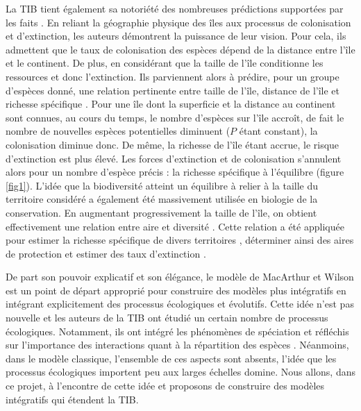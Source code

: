 La TIB tient également sa notoriété des nombreuses prédictions
supportées par les faits \cite{MacArthur1967}. En reliant la géographie
physique des îles aux processus de colonisation et d'extinction, les
auteurs démontrent la puissance de leur vision. Pour cela, ils admettent
que le taux de colonisation des espèces dépend de la distance entre
l'île et le continent. De plus, en considérant que la taille de l'île
conditionne les ressources et donc l'extinction. Ils parviennent alors à
prédire, pour un groupe d'espèces donné, une relation pertinente entre
taille de l'île, distance de l'île et richesse spécifique
\cite{MacArthur1967}. Pour une île dont la superficie et la distance au
continent sont connues, au cours du temps, le nombre d'espèces sur l'île
accroît, de fait le nombre de nouvelles espèces potentielles diminuent
(\(P\) étant constant), la colonisation diminue donc. De même, la
richesse de l'île étant accrue, le risque d'extinction est plus élevé.
Les forces d'extinction et de colonisation s'annulent alors pour un
nombre d'espèce précis : la richesse spécifique à l'équilibre (figure
\ref{fig1}). L'idée que la biodiversité atteint un équilibre à relier à
la taille du territoire considéré a également été massivement utilisée
en biologie de la conservation. En augmentant progressivement la taille
de l'île, on obtient effectivement une relation entre aire et diversité
\cite{MacArthur1967, Lomolino2000a}. Cette relation a été appliquée pour
estimer la richesse spécifique de divers territoires \cite{May1988},
déterminer ainsi des aires de protection \cite{Neigel2003,Desmet2004} et
estimer des taux d'extinction \cite{He2011}.

De part son pouvoir explicatif et son élégance, le modèle de MacArthur
et Wilson est un point de départ approprié pour construire des modèles
plus intégratifs en intégrant explicitement des processus écologiques et
évolutifs. Cette idée n'est pas nouvelle et les auteurs de la TIB ont
étudié un certain nombre de processus écologiques. Notamment, ils ont
intégré les phénomènes de spéciation \cite{MacArthur1967} et réfléchis
sur l'importance des interactions quant à la répartition des espèces
\cite{MacArthur1984}. Néanmoins, dans le modèle classique, l'ensemble de
ces aspects sont absents, l'idée que les processus écologiques importent
peu aux larges échelles domine. Nous allons, dans ce projet, à
l'encontre de cette idée et proposons de construire des modèles
intégratifs qui étendent la TIB.

